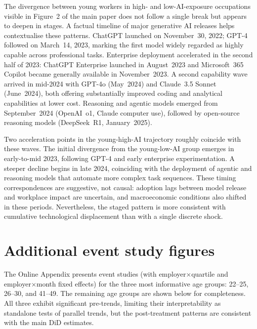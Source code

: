 \documentclass[preprint,12pt,authoryear]{elsarticle}
\begin{document}
The divergence between young workers in high- and low-AI-exposure occupations visible in Figure~2 of the main paper does not follow a single break but appears to deepen in stages. A factual timeline of major generative AI releases helps contextualise these patterns. ChatGPT launched on November~30, 2022; GPT-4 followed on March~14, 2023, marking the first model widely regarded as highly capable across professional tasks. Enterprise deployment accelerated in the second half of 2023: ChatGPT Enterprise launched in August~2023 and Microsoft~365 Copilot became generally available in November~2023. A second capability wave arrived in mid-2024 with GPT-4o (May~2024) and Claude~3.5 Sonnet (June~2024), both offering substantially improved coding and analytical capabilities at lower cost. Reasoning and agentic models emerged from September~2024 (OpenAI~o1, Claude computer use), followed by open-source reasoning models (DeepSeek~R1, January~2025).

Two acceleration points in the young-high-AI trajectory roughly coincide with these waves. The initial divergence from the young-low-AI group emerges in early-to-mid 2023, following GPT-4 and early enterprise experimentation. A steeper decline begins in late 2024, coinciding with the deployment of agentic and reasoning models that automate more complex task sequences. These timing correspondences are suggestive, not causal: adoption lags between model release and workplace impact are uncertain, and macroeconomic conditions also shifted in these periods. Nevertheless, the staged pattern is more consistent with cumulative technological displacement than with a single discrete shock.



\section{Additional event study figures}

The Online Appendix presents event studies (with employer$\times$quartile and employer$\times$month fixed effects) for the three most informative age groups: 22--25, 26--30, and 41--49. The remaining age groups are shown below for completeness. All three exhibit significant pre-trends, limiting their interpretability as standalone tests of parallel trends, but the post-treatment patterns are consistent with the main DiD estimates.
\end{document}
